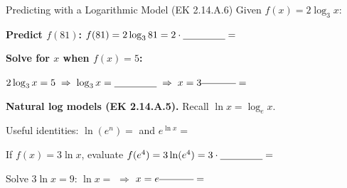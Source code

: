 \documentclass[10pt]{article}
\begin{document}
\vspace{0.08in}

\begin{notesbox}{Predicting with a Logarithmic Model (EK 2.14.A.6)}
Given $f(x) = 2\log_3 x$:

\vspace{6pt}
\textbf{Predict $f(81)$:} \quad $f(81) = 2\log_3 81 = 2 \cdot \blank{1.5cm} = $ \blank{2cm}

\vspace{6pt}
\textbf{Solve for $x$ when $f(x) = 5$:}

\vspace{4pt}
$2\log_3 x = 5 \;\Rightarrow\; \log_3 x = \blank{1.5cm} \;\Rightarrow\; x = 3^{\blank{1.2cm}} = $ \blank{3cm}

\vspace{8pt}
\textbf{Natural log models (EK 2.14.A.5).} Recall $\ln x = \log_e x$.

\vspace{4pt}
Useful identities: \quad $\ln(e^n) = $ \blank{1.5cm} \quad and \quad $e^{\ln x} = $ \blank{1.5cm}

\vspace{4pt}
If $f(x) = 3\ln x$, evaluate $f(e^4) = 3\ln(e^4) = 3 \cdot \blank{1.5cm} = $ \blank{2cm}

\vspace{4pt}
Solve $3\ln x = 9$: \quad $\ln x = $ \blank{1.5cm} \quad $\Rightarrow$ \quad $x = e^{\blank{1.2cm}} = $ \blank{2cm}
\end{notesbox}
\end{document}
